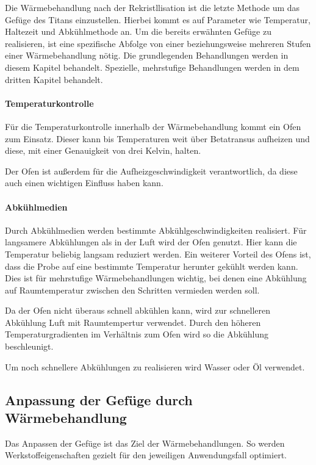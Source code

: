 \documentclass[a4paper, 11pt]{tubsreprt}
\begin{document}
Die Wärmebehandlung nach der Rekristllisation ist die letzte Methode um das Gefüge des Titans einzustellen. Hierbei kommt es auf Parameter wie Temperatur, Haltezeit und Abkühlmethode an. Um die bereits erwähnten Gefüge zu realisieren, ist eine spezifische Abfolge von einer beziehungsweise mehreren Stufen einer Wärmebehandlung nötig. Die grundlegenden Behandlungen werden in diesem Kapitel behandelt. Spezielle, mehrstufige Behandlungen werden in dem dritten Kapitel behandelt.
\paragraph{Temperaturkontrolle}
Für die Temperaturkontrolle innerhalb der Wärmebehandlung kommt ein Ofen zum Einsatz. Dieser kann bis Temperaturen weit über Betatransus aufheizen und diese, mit einer Genauigkeit von drei Kelvin, halten. 

Der Ofen ist außerdem für die Aufheizgeschwindigkeit verantwortlich, da diese auch einen wichtigen Einfluss haben kann.
\paragraph{Abkühlmedien}

Durch Abkühlmedien werden bestimmte Abkühlgeschwindigkeiten realisiert. Für langsamere Abkühlungen als in der Luft wird der Ofen genutzt. Hier kann die Temperatur beliebig langsam reduziert werden. Ein weiterer Vorteil des Ofens ist, dass die Probe auf eine bestimmte Temperatur herunter gekühlt werden kann. Dies ist für mehrstufige Wärmebehandlungen wichtig, bei denen eine Abkühlung auf Raumtemperatur zwischen den Schritten vermieden werden soll. 

Da der Ofen nicht überaus schnell abkühlen kann, wird zur schnelleren Abkühlung Luft mit Raumtempertur verwendet. Durch den höheren Temperaturgradienten im Verhältnis zum Ofen wird so die Abkühlung beschleunigt.  

Um noch schnellere Abkühlungen zu realisieren wird Wasser oder Öl verwendet. 
\subsection*{Anpassung der Gefüge durch Wärmebehandlung}

Das Anpassen der Gefüge ist das Ziel der Wärmebehandlungen. So werden Werkstoffeigenschaften gezielt für den jeweiligen Anwendungsfall optimiert. 


\end{document}
